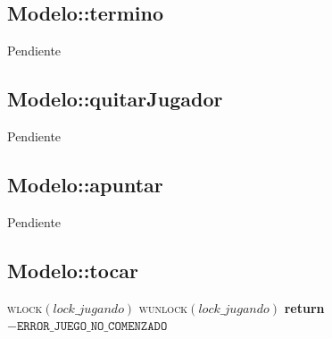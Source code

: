 \documentclass[a4paper,10pt,twoside]{article}
\newenvironment{pseudo}[1][]{%
    \vspace{0.5em}%
    \begin{algorithmic}%
}
{%
    \end{algorithmic}%
    \vspace{0.5em}%
}
\newcommand{\Fn}[2]{\textsc{#1}$(#2)$}
\newcommand{\PReturn}[1]{\textbf{return} $#1$}
\begin{document}
\subsection{Modelo::termino}

Pendiente


\subsection{Modelo::quitarJugador}

Pendiente


\subsection{Modelo::apuntar}

Pendiente


\subsection{Modelo::tocar}

\begin{pseudo}
        \State \Fn{wlock}{lock\_jugando}
            \State \Fn{wunlock}{lock\_jugando}
            \State \PReturn{- \texttt{ERROR\_JUEGO\_NO\_COMENZADO}}
        \EndIf
        \State
        \State
    \EndProcedure
\end{pseudo}




    



            
\end{document}
